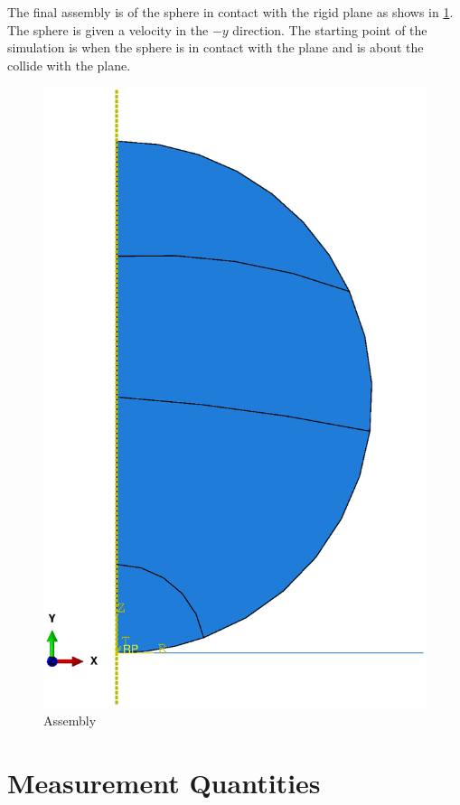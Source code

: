 The final assembly is of the sphere in contact with the rigid plane as shows in \ref{fig:assembly}. The sphere is given a velocity in the $-y$ direction. The starting point of the simulation is when the sphere is in contact with the plane and is about the collide with the plane.
\begin{figure}[H]
    \centering
	\includegraphics[scale=0.5]{../images/SimulationSetup/Assembly.eps}
	\caption{Assembly}
	\label{fig:assembly}
\end{figure}

\section{Measurement Quantities}

